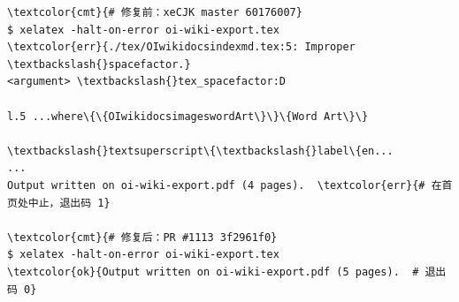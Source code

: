 \documentclass{article}
\begin{document}
\vspace*{3mm}
\begin{Verbatim}[fontsize=\small,commandchars=\\\{\},xleftmargin=5mm]
\textcolor{cmt}{# 修复前：xeCJK master 60176007}
$ xelatex -halt-on-error oi-wiki-export.tex
\textcolor{err}{./tex/OIwikidocsindexmd.tex:5: Improper \textbackslash{}spacefactor.}
<argument> \textbackslash{}tex_spacefactor:D

l.5 ...where\{\{OIwikidocsimageswordArt\}\}\{Word Art\}\}
                                                  \textbackslash{}textsuperscript\{\textbackslash{}label\{en...
...
Output written on oi-wiki-export.pdf (4 pages).  \textcolor{err}{# 在首页处中止，退出码 1}

\textcolor{cmt}{# 修复后：PR #1113 3f2961f0}
$ xelatex -halt-on-error oi-wiki-export.tex
\textcolor{ok}{Output written on oi-wiki-export.pdf (5 pages).  # 退出码 0}
\end{Verbatim}
\end{document}
